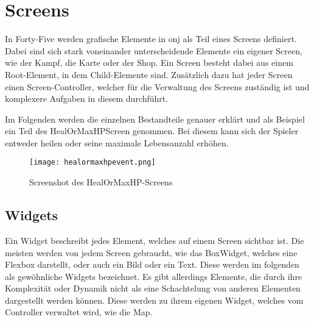 \renewcommand{\kapitelautor}{Autor: Felix Zwickelstorfer}
\section{Screens}\label{sec:screens}
\renewcommand{\kapitelautor}{Autor: Felix Zwickelstorfer}
In Forty-Five werden grafische Elemente in onj als Teil eines Screens definiert.
Dabei sind sich stark voneinander unterscheidende Elemente ein eigener Screen, wie \zB der Kampf, die Karte oder der Shop.
Ein Screen besteht dabei aus einem Root-Element, in dem Child-Elemente sind.
Zusätzlich dazu hat jeder Screen einen Screen-Controller, welcher für die Verwaltung des Screens zuständig ist und komplexere Aufgaben in diesem durchführt.

Im Folgenden werden die einzelnen Bestandteile genauer erklärt und als Beispiel ein Teil des HealOrMaxHPScreen genommen.
Bei diesem kann sich der Spieler entweder heilen oder seine maximale Lebensanzahl erhöhen.
\begin{figure}[H]
    \centering
    \texttt{[image: healormaxhpevent.png]}
    \caption{Screenshot des HealOrMaxHP-Screens}
\end{figure}
\renewcommand{\kapitelautor}{Autor: Felix Zwickelstorfer}
\subsection{Widgets}\label{sec:widgets}
\renewcommand{\kapitelautor}{Autor: Felix Zwickelstorfer}
Ein Widget beschreibt jedes Element, welches auf einem Screen sichtbar ist.
Die meisten werden von jedem Screen gebraucht, wie \zB das Box\-Widget, welches eine Flexbox darstellt, oder auch ein Bild oder ein Text.
Diese werden im folgenden als gewöhnliche Widgets bezeichnet.
Es gibt allerdings Elemente, die durch ihre Komplexität oder Dynamik nicht als eine Schachtelung von anderen Elementen dargestellt werden können.
Diese werden zu ihrem eigenen Widget, welches vom Controller verwaltet wird, wie \zB die Map.
\renewcommand{\kapitelautor}{Autor: Felix Zwickelstorfer}
